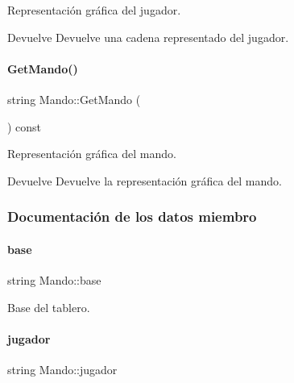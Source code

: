 Representación gráfica del jugador. 

\begin{DoxyReturn}{Devuelve}
Devuelve una cadena representado del jugador. 
\end{DoxyReturn}
\hypertarget{classMando_ac7ff39c5a065899658f8ee3a335ee50f}{}\label{classMando_ac7ff39c5a065899658f8ee3a335ee50f} 
\paragraph{\texorpdfstring{Get\+Mando()}{GetMando()}}
{\footnotesize\ttfamily string Mando\+::\+Get\+Mando (\begin{DoxyParamCaption}{ }\end{DoxyParamCaption}) const\hspace{0.3cm}{\ttfamily [inline]}}



Representación gráfica del mando. 

\begin{DoxyReturn}{Devuelve}
Devuelve la representación gráfica del mando. 
\end{DoxyReturn}


\subsubsection{Documentación de los datos miembro}
\hypertarget{classMando_ad914a93d7fb6c085a26d5d70bbb7fecd}{}\label{classMando_ad914a93d7fb6c085a26d5d70bbb7fecd} 
\paragraph{\texorpdfstring{base}{base}}
{\footnotesize\ttfamily string Mando\+::base\hspace{0.3cm}{\ttfamily [private]}}



Base del tablero. 

\hypertarget{classMando_ab4791c4f5bb306c1bbcf95047e010163}{}\label{classMando_ab4791c4f5bb306c1bbcf95047e010163} 
\paragraph{\texorpdfstring{jugador}{jugador}}
{\footnotesize\ttfamily string Mando\+::jugador\hspace{0.3cm}{\ttfamily [private]}}



